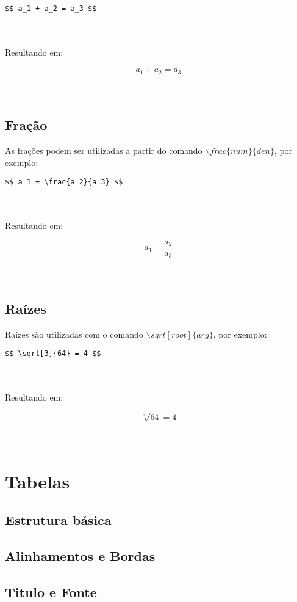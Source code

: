 \documentclass[12pt,a4paper]{article}
\begin{document}
\begin{BVerbatim}
$$ a_1 + a_2 = a_3 $$ 
\end{BVerbatim}
\\
\\
Resultando em: 

$$ a_1 + a_2 = a_3 $$ 
\\
\\

\subsection{Fração}

As frações podem ser utilizadas a partir do comando $\backslash frac\{num\}\{den\} $, por exemplo:

\begin{BVerbatim}
$$ a_1 = \frac{a_2}{a_3} $$ 
\end{BVerbatim}
\\
\\
Resultando em: 

$$ a_1 = \frac{a_2}{a_3} $$ 
\\
\\

\subsection{Raízes}

Raízes são utilizadas com o comando $ \backslash sqrt[root]\{arg\} $, por exemplo:

\begin{BVerbatim}
$$ \sqrt[3]{64} = 4 $$ 
\end{BVerbatim}
\\
\\
Resultando em: 

$$ \sqrt[3]{64} = 4 $$ 
\\
\\

\section{Tabelas}
\subsection{Estrutura básica}
\subsection{Alinhamentos e Bordas}
\subsection{Titulo e Fonte}

	
\end{document}
